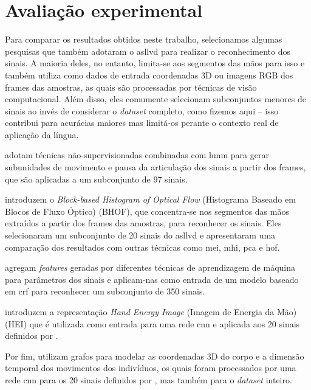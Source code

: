 \chapter{Avaliação experimental}
\label{cap:avaliacao}



Para comparar os resultados obtidos neste trabalho, selecionamos algumas pesquisas que também adotaram o \acrshort{asllvd} para realizar o reconhecimento dos sinais. 
A maioria deles, no entanto, limita-se aos segmentos das mãos para isso e também utiliza como dados de entrada coordenadas 3D ou imagens RGB dos frames das amostras, as quais são processadas por técnicas de visão computacional. 
Além disso, eles comumente selecionam subconjuntos menores de sinais ao invés de considerar o \textit{dataset} completo, como fizemos aqui -- isso contribui para acurácias maiores mas limitá-os perante o contexto real de aplicação da língua.

 adotam técnicas não-supervisionadas combinadas com \acrfull{hmm} para gerar subunidades de movimento e pausa da articulação dos sinais a partir dos frames, que são aplicadas a um subconjunto de 97 sinais.

 introduzem o \textit{Block-based Histogram of Optical Flow} (Histograma Baseado em Blocos de Fluxo Óptico) (BHOF), que concentra-se nos segmentos das mãos extraídos a partir dos frames das amostras, para reconhecer os sinais. Eles selecionaram um subconjunto de 20 sinais do \acrshort{asllvd} e apresentaram uma comparação dos resultados com outras técnicas como \acrshort{mei}, \acrshort{mhi}, \acrshort{pca} e \acrshort{hof}.

 agregam \textit{features} geradas por diferentes técnicas de aprendizagem de máquina para parâmetros dos sinais e aplicam-nas como entrada de um modelo baseado em \acrfull{crf} para reconhecer um subconjunto de 350 sinais.

 introduzem a representação \textit{Hand Energy Image} (Imagem de Energia da Mão) (HEI) que é utilizada como entrada para uma rede \acrshort{cnn} e aplicada aos 20 sinais definidos por .

Por fim,  utilizam grafos para modelar as coordenadas 3D do corpo e a dimensão temporal dos movimentos dos indivíduos, os quais foram processados por uma rede \acrshort{cnn} para os 20 sinais definidos por , mas também para o \textit{dataset} inteiro.



